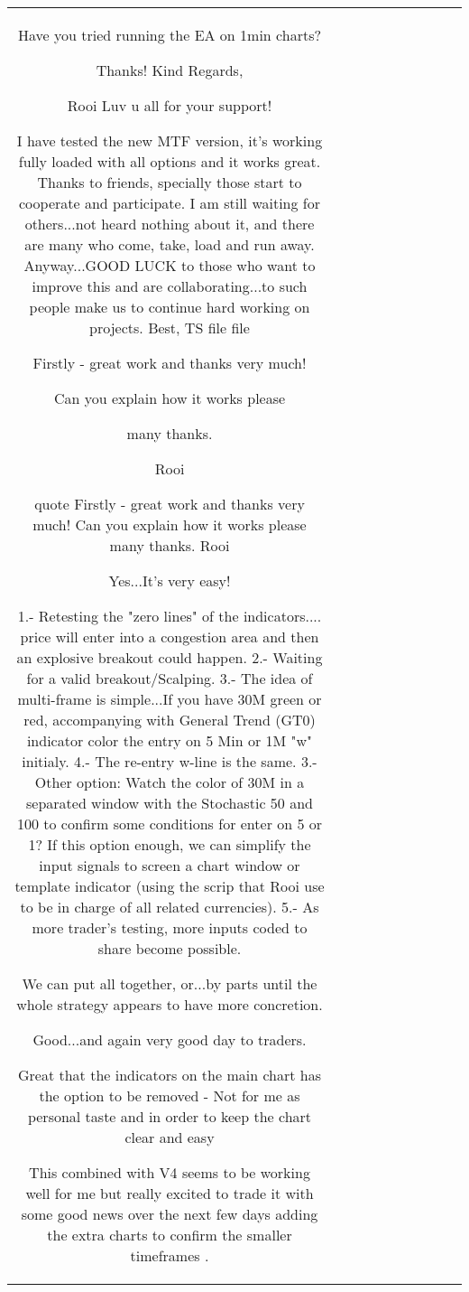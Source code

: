 \begin{table}[h!]
\begin{tabular}{|c|c|c|c|c|c|c|c|c|c|}
Have you tried running the EA on 1min charts?

Thanks! Kind Regards, 

Rooi
Luv u all  for your support!

I have tested the new MTF version, it's working fully loaded with all options and it works great. Thanks to friends, specially those start to cooperate and participate. I am still waiting for others...not heard nothing about it, and there are many who come, take, load and run away.  Anyway...GOOD LUCK to those who want to improve this and are collaborating...to such people make us to continue hard working on projects. Best, TS {file} {file}

Firstly - great work and thanks very much!

Can you explain how it works please

many thanks.

Rooi


{quote} Firstly - great work and thanks very much! Can you explain how it works please many thanks. Rooi 

Yes...It's very easy!

1.- Retesting the "zero lines" of the indicators.... price will enter into a congestion area and then an explosive breakout could happen.
2.- Waiting for a valid breakout/Scalping.
3.- The idea of multi-frame is simple...If you have 30M green or red, accompanying with General Trend (GT0) indicator color the entry on 5 Min or 1M "w" initialy.
4.- The re-entry w-line is the same.
3.- Other option: Watch the color of 30M in a separated window with the Stochastic 50 and 100 to confirm some conditions for enter on 5 or 1? If this option enough, we can simplify the input signals to screen a chart window or template indicator (using the scrip that Rooi use to be in charge of all related currencies).
5.- As more trader's testing, more inputs coded to share become possible.

We can put all together, or...by parts until the whole strategy appears to have more concretion.

Good...and again very good day to traders.

Great that the indicators on the main chart has the option to be removed - Not for me as personal taste and in order to keep the chart clear and easy

This combined with V4 seems to be working well for me but really excited to trade it with some good news over the next few days adding the extra charts to confirm the smaller timeframes .


\end{tabular}
\end{table}
